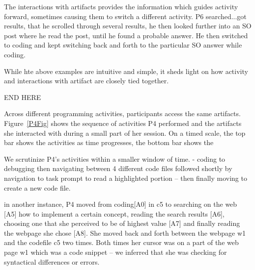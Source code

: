 The interactions with artifacts provides the information which guides activity forward, sometimes causing them to switch a different activity. P6 searched...got results, that he scrolled through several results, he then looked further into an SO post where he read the post, until he found a probable answer. He then switched to coding and kept switching back and forth to the particular SO answer while coding.

While hte above examples are intuitive and simple, it sheds light on how activity and interactions with artifact are closely tied together.

END HERE 


Across different programming activities, participants access the same artifacts. Figure~\ref{P4Fig} shows the sequence of activities P4 performed and the artifacts she interacted with during a small part of her session. On a timed scale, the top bar shows the activities as time progresses, the bottom bar shows the   

We scrutinize P4's activities within a smaller window of time.
- coding to debugging then navigating between 4 different code files followed shortly by navigation to task prompt to read a highlighted portion -- then finally moving to create a new code file.




in another instance, P4 moved from coding[A0] in c5 to searching on the web [A5] how to implement a certain concept, reading the search results [A6], choosing one that she perceived to be of highest value [A7] and finally reading the webpage she chose [A8]. She moved back and forth between the webpage w1 and the codefile c5 two times. Both times her cursor was on a part of the web page w1 which was a code snippet -- we inferred that she was checking for syntactical differences or errors. 

